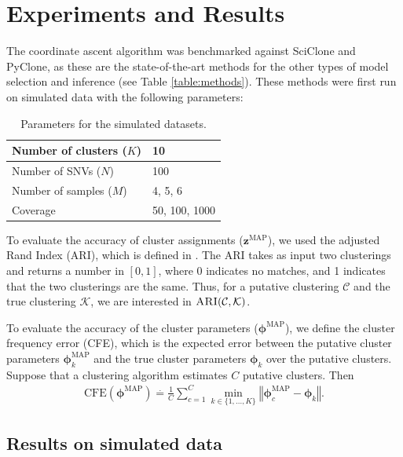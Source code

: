 \documentclass[11pt]{article}
\newcommand{\bz}{\ensuremath{\mathbf{z}}}
\newcommand{\bphi}{\ensuremath{\bm{\phi}}}
\newcommand{\defeq}{\stackrel{.}{=}}
\begin{document}
\section{Experiments and Results}

The coordinate ascent algorithm was benchmarked against SciClone and PyClone, as these are the state-of-the-art methods for the other types of model selection and inference (see Table \ref{table:methods}). These methods were first run on simulated data with the following parameters:

\begin{table}[ht]
\centering
\begin{tabular}{| l | l |}
\hline
Number of clusters ($K$) & 10            \\ \hline
Number of SNVs ($N$)     & 100           \\ \hline
Number of samples ($M$)  & 4, 5, 6       \\ \hline
Coverage                 & 50, 100, 1000  \\ \hline
\end{tabular}
\caption{Parameters for the simulated datasets.}
\label{table:simulateddata}
\end{table}

To evaluate the accuracy of cluster assignments ($\bz^{\text{MAP}}$), we used the adjusted Rand Index (ARI), which is defined in \cite{Rand1971}. The ARI takes as input two clusterings and returns a number in $[0,1]$, where 0 indicates no matches, and 1 indicates that the two clusterings are the same. Thus, for a putative clustering $\mathcal{C}$ and the true clustering $\mathcal{K}$, we are interested in $\textsc{ARI}(\mathcal{C}, \mathcal{K})$.

To evaluate the accuracy of the cluster parameters ($\bphi^{\text{MAP}}$), we define the cluster frequency error (CFE), which is the expected error between the putative cluster parameters $\bphi^{\text{MAP}}_k$ and the true cluster parameters $\bphi_k$ over the putative clusters. Suppose that a clustering algorithm estimates $C$ putative clusters. Then
\begin{align}
\text{CFE}(\bphi^{\text{MAP}}) \defeq  \frac{1}{C} \sum_{c=1}^C \min_{k \in \{1, \ldots, K\}}  \left\Vert \bphi_c^{\text{MAP}} - \bphi_k \right\Vert.
\end{align}

\subsection{Results on simulated data}
\end{document}
